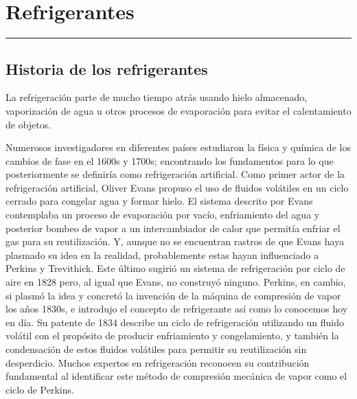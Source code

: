 \chapter{Refrigerantes}

\vspace{\fill}

\hrule

\vspace{.3cm}

{\large \lipsum[1]} 

\pagestyle{fancy}

\newpage

	\section{Historia de los refrigerantes}

	La refrigeración parte de mucho tiempo atrás usando hielo almacenado, vaporización de agua u otros procesos de evaporación para evitar el calentamiento de objetos. 

	Numerosos investigadores en diferentes países estudiaron la física y química de los cambios de fase en el 1600s y 1700s; encontrando los fundamentos para lo que posteriormente se definiría como refrigeración artificial. Como primer actor de la refrigeración artificial, Oliver Evans propuso el uso de fluidos volátiles en un ciclo cerrado para congelar agua y formar hielo. El sistema descrito por Evans contemplaba un proceso de evaporación por vacío, enfriamiento del agua y posterior bombeo de vapor a un intercambiador de calor que permitía enfriar el gas para su reutilización. Y, aunque no se encuentran rastros de que Evans haya plasmado su idea en la realidad, probablemente estas hayan influenciado a Perkins y Trevithick. Este último sugirió un sistema de refrigeración por ciclo de aire en 1828 pero, al igual que Evans, no construyó ninguno. Perkins, en cambio, si plasmó la idea y concretó la invención de la máquina de compresión de vapor los años 1830s, e introdujo el concepto de refrigerante así como lo conocemos hoy en día. Su patente de 1834 describe un ciclo de refrigeración utilizando un fluido volátil con el propósito de producir enfriamiento y congelamiento, y también la condensación de estos fluidos volátiles para permitir su reutilización sin desperdicio. Muchos expertos en refrigeración reconocen su contribución fundamental al identificar este método de compresión mecánica de vapor como el ciclo de Perkins.

